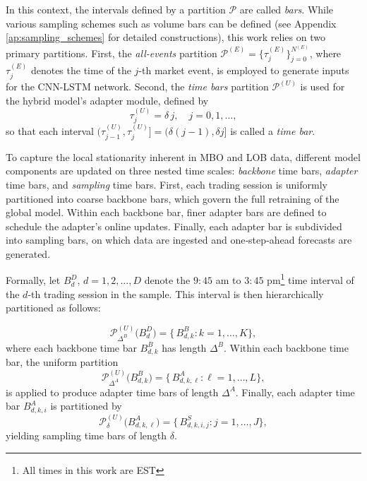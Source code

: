 \documentclass[10pt,a4paper,oneside]{article}
\begin{document}
In this context, the intervals defined by a partition \(\mathcal{P}\) are called \emph{bars}. While various sampling schemes such as volume bars can be defined (see Appendix \ref{ap:sampling_schemes} for detailed constructions), this work relies on two primary partitions. First, the \emph{all-events} partition \(\mathcal{P}^{(E)} = \{\tau^{(E)}_j\}_{j=0}^{N^{(E)}}\), where \(\tau^{(E)}_j\) denotes the time of the \(j\)-th market event, is employed to generate inputs for the CNN-LSTM network. Second, the \emph{time bars} partition \(\mathcal{P}^{(U)}\) is used for the hybrid model's adapter module, defined by
\[
    \tau^{(U)}_j=\delta\,j,\quad j=0,1,\dots,
\]
so that each interval \((\tau^{(U)}_{j-1},\tau^{(U)}_j]=(\delta(j-1),\delta j]\) is called a \emph{time bar}.

To capture the local stationarity inherent in MBO and LOB data, different model components are updated on three nested time scales: \emph{backbone} time bars, \emph{adapter} time bars, and \emph{sampling} time bars.  First, each trading session is uniformly partitioned into coarse backbone bars, which govern the full retraining of the global model.  Within each backbone bar, finer adapter bars are defined to schedule the adapter’s online updates. Finally, each adapter bar is subdivided into sampling bars, on which data are ingested and one‐step‐ahead forecasts are generated.

Formally, let $B^D_d$, $d = 1, 2, \dots, D$ denote the $9:45$ am to $3:45$ pm\footnote{All times in this work are EST} time interval of the $d$-th trading session in the sample. This interval is then hierarchically partitioned as follows:

\[
    \mathcal P^{(U)}_{\Delta^B}\bigl(B^D_d\bigr)
    =\{\,B^B_{d,k}:k=1,\dots,K\},
\]
where each backbone time bar \(B^B_{d,k}\) has length \(\Delta^B\).  Within each backbone time bar, the uniform partition
\[
    \mathcal P^{(U)}_{\Delta^A}\bigl(B^B_{d,k}\bigr)
    =\{\,B^A_{d,k,\ell}:\ell=1,\dots,L\},
\]
is applied to produce adapter time bars of length \(\Delta^A\).  Finally, each adapter time bar \(B^A_{d,k,i}\) is partitioned by
\[
    \mathcal P^{(U)}_{\delta}\bigl(B^A_{d,k,\ell}\bigr)
    =\{\,B^S_{d,k,i,j}:j=1,\dots,J\},
\]
yielding sampling time bars of length \(\delta\).

\end{document}
